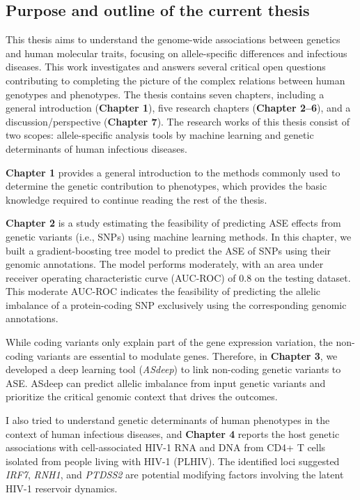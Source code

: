 \documentclass{book}
\begin{document}
\begin{refsection}
\section*{Purpose and outline of the current thesis}
This thesis aims to understand the genome-wide associations between genetics and human molecular traits, focusing on allele-specific differences and infectious diseases.
This work investigates and answers several critical open questions contributing to completing the picture of the complex relations between human genotypes and phenotypes.
The thesis contains seven chapters, including a general introduction (\textbf{Chapter 1}), five research chapters (\textbf{Chapter 2–6}), and a discussion/perspective (\textbf{Chapter 7}).
The research works of this thesis consist of two scopes: allele-specific analysis tools by machine learning and genetic determinants of human infectious diseases.

\textbf{Chapter 1} provides a general introduction to the methods commonly used to determine the genetic contribution to phenotypes, which provides the basic knowledge required to continue reading the rest of the thesis.

\textbf{Chapter 2} is a study estimating the feasibility of predicting ASE effects from genetic variants (i.e., SNPs) using machine learning methods.
In this chapter, we built a gradient-boosting tree model to predict the ASE of SNPs using their genomic annotations.
The model performs moderately, with an area under receiver operating characteristic curve (AUC-ROC) of 0.8 on the testing dataset.
This moderate AUC-ROC indicates the feasibility of predicting the allelic imbalance of a protein-coding SNP exclusively using the corresponding genomic annotations.

While coding variants only explain part of the gene expression variation, the non-coding variants are essential to modulate genes.
Therefore, in \textbf{Chapter 3}, we developed a deep learning tool (\textit{ASdeep}) to link non-coding genetic variants to ASE.
ASdeep can predict allelic imbalance from input genetic variants and prioritize the critical genomic context that drives the outcomes.

I also tried to understand genetic determinants of human phenotypes in the context of human infectious diseases, and \textbf{Chapter 4} reports the host genetic associations with cell-associated HIV-1 RNA and DNA from CD4+ T cells isolated from people living with HIV-1 (PLHIV).
The identified loci suggested \textit{IRF7}, \textit{RNH1}, and \textit{PTDSS2} are potential modifying factors involving the latent HIV-1 reservoir dynamics.


\end{refsection}
\end{document}
